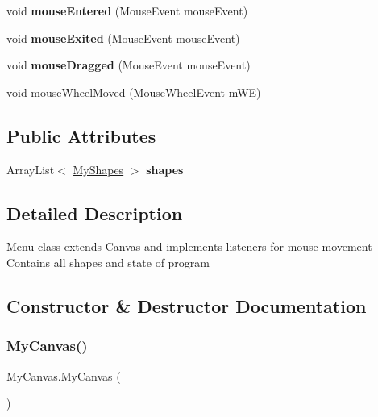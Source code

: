 \begin{DoxyCompactItemize}
\mbox{\label{classMyCanvas_a223525c9eed93d7b3ebc0a82ca484dec}} 
void {\bfseries mouse\+Entered} (Mouse\+Event mouse\+Event)
\item 
\mbox{\label{classMyCanvas_a86660d0047ac7ec9e7c29e53b1a64a5a}} 
void {\bfseries mouse\+Exited} (Mouse\+Event mouse\+Event)
\item 
\mbox{\label{classMyCanvas_ade21396b96145a790c55c01c115b10a5}} 
void {\bfseries mouse\+Dragged} (Mouse\+Event mouse\+Event)
\item 
void \hyperlink{classMyCanvas_a700a9732a3ad85bfc2c000188db65080}{mouse\+Wheel\+Moved} (Mouse\+Wheel\+Event m\+WE)
\end{DoxyCompactItemize}
\subsection*{Public Attributes}
\begin{DoxyCompactItemize}
\item 
\mbox{\label{classMyCanvas_a073c97b8422d06ddaf2c29114985f46d}} 
Array\+List$<$ \hyperlink{classMyShapes}{My\+Shapes} $>$ {\bfseries shapes}
\end{DoxyCompactItemize}


\subsection{Detailed Description}
Menu class extends Canvas and implements listeners for mouse movement Contains all shapes and state of program 

\subsection{Constructor \& Destructor Documentation}
\mbox{\label{classMyCanvas_ad66ffeff27547650fe0cbc19c67653b6}} 
\subsubsection{\texorpdfstring{My\+Canvas()}{MyCanvas()}}
{\footnotesize\ttfamily My\+Canvas.\+My\+Canvas (\begin{DoxyParamCaption}{ }\end{DoxyParamCaption})\hspace{0.3cm}{\ttfamily [inline]}}

